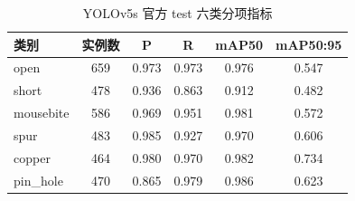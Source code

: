 \begin{table}[t]
\centering
\caption{YOLOv5s 官方 test 六类分项指标}
\label{tab:yolo_perclass}
\small
\setlength{\tabcolsep}{3.5pt}
\begin{tabular}{lccccc}
\toprule
类别 & 实例数 & P & R & mAP50 & mAP50:95 \\
\midrule
open & 659 & 0.973 & 0.973 & 0.976 & 0.547 \\
short & 478 & 0.936 & 0.863 & 0.912 & 0.482 \\
mousebite & 586 & 0.969 & 0.951 & 0.981 & 0.572 \\
spur & 483 & 0.985 & 0.927 & 0.970 & 0.606 \\
copper & 464 & 0.980 & 0.970 & 0.982 & 0.734 \\
pin\_hole & 470 & 0.865 & 0.979 & 0.986 & 0.623 \\
\bottomrule
\end{tabular}
\end{table}
